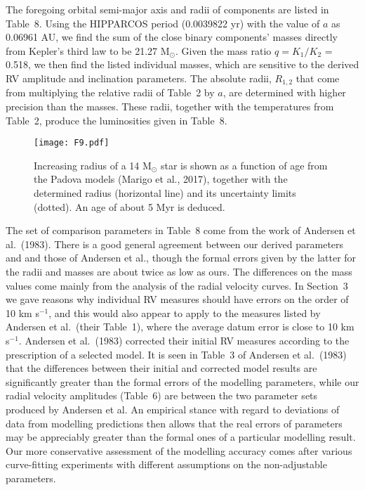 \documentclass[useAMS,usenatbib]{mnras}                                                                           \usepackage[pdftex]{graphicx}
\begin{document}
The foregoing orbital semi-major axis and radii of components are listed in Table~8.
Using the HIPPARCOS period (0.0039822 yr) with the value of $a$ as 0.06961 AU,
 we find the sum of the close binary components' masses  
directly from Kepler's third law to be 21.27 M$_{\odot}$.
Given the mass ratio $q = K_1/K_2$ = 0.518, we then find the listed individual masses,
which are sensitive to the derived
RV amplitude and inclination parameters.     
The absolute radii, $R_{1,2}$ that
come from multiplying the relative radii of Table~2 by $a$,
are determined with higher precision than the masses.
These radii, together with the temperatures from Table~2, 
produce  the luminosities given in Table~8.

 
\begin{figure}
\label{fig-10}
\centering
\texttt{[image: F9.pdf]}\\
\caption{Increasing radius of a 14 M$_{\odot}$ star is shown
as a function of age from the Padova models (Marigo et al., 2017),
together with the determined radius (horizontal line)
and its uncertainty limits (dotted).
An age of about 5 Myr is deduced. 
}
\end{figure} 

The set of comparison parameters  in Table~8  come from the work of Andersen et al.\ (1983).
 There is a good general agreement between our derived parameters and 
 and those of Andersen et al., though the formal errors
  given by the latter for the radii and masses are  about twice as low as 
  ours.  The differences on the mass values come mainly from the
  analysis of the radial velocity curves.  In Section~3 we gave reasons why 
  individual RV measures should have errors on the order of 10 km s$^{-1}$,
  and this would also appear to apply to the measures listed by Andersen et al.\
  (their Table~1),
  where the average datum error is close to 10 km s$^{-1}$.
  Andersen et al.\ (1983) corrected their initial RV measures according to the prescription
  of a selected model.  It is seen in  Table~3 of Andersen et al.\ (1983)
  that the differences between their initial and corrected model results 
  are significantly greater than the formal errors of the modelling parameters, while
  our radial velocity amplitudes (Table~6)
  are between the two parameter sets produced by Andersen et al.
  An empirical stance with regard to deviations of data from modelling predictions then
  allows that the real errors of parameters may be appreciably greater than the formal ones
  of a particular modelling result. Our more conservative assessment of the
  modelling accuracy comes after various curve-fitting experiments with
  different assumptions on the non-adjustable parameters.
\end{document}
